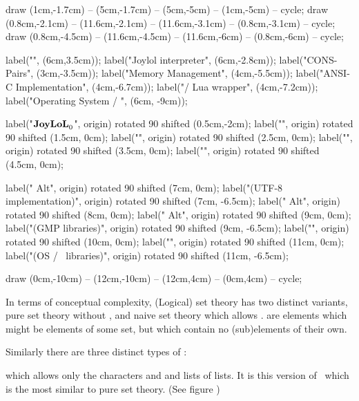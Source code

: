 draw (1cm,-1.7cm)   -- (5cm,-1.7cm)    -- (5cm,-5cm)      -- (1cm,-5cm)     -- cycle;
draw (0.8cm,-2.1cm) -- (11.6cm,-2.1cm) -- (11.6cm,-3.1cm) -- (0.8cm,-3.1cm) -- cycle;
draw (0.8cm,-4.5cm) -- (11.6cm,-4.5cm) -- (11.6cm,-6cm)   -- (0.8cm,-6cm)   -- cycle;


label("", (6cm,3.5cm));
label("Joylol interpreter", (6cm,-2.8cm));
label("CONS-Pairs", (3cm,-3.5cm));
label("Memory Management", (4cm,-5.5cm));
label("ANSI-C Implementation", (4cm,-6.7cm));
label("/ Lua wrapper", (4cm,-7.2cm));
label("Operating System / \LuaTeX", (6cm, -9cm));

label("$\bold{JoyLoL}_0$", origin) rotated 90 shifted (0.5cm,-2cm);
label("", origin) rotated 90 shifted (1.5cm, 0cm);
label("", origin) rotated 90 shifted (2.5cm, 0cm);
label("", origin) rotated 90 shifted (3.5cm, 0cm);
label("", origin) rotated 90 shifted (4.5cm, 0cm);

label(" Alt", origin) rotated 90 shifted (7cm, 0cm);
label("(UTF-8 implementation)", origin) rotated 90 shifted (7cm, -6.5cm);
label(" Alt", origin) rotated 90 shifted (8cm, 0cm);
label(" Alt", origin) rotated 90 shifted (9cm, 0cm);
label("(GMP libraries)", origin) rotated 90 shifted (9cm, -6.5cm);
label("", origin) rotated 90 shifted (10cm, 0cm);
label("", origin) rotated 90 shifted (11cm, 0cm);
label("(OS / \LuaTeX\ libraries)", origin) rotated 90 shifted (11cm, -6.5cm);

draw (0cm,-10cm) -- (12cm,-10cm) -- (12cm,4cm) -- (0cm,4cm) -- cycle;

\stopMPcode\egroup

In terms of conceptual complexity, (Logical) set theory has two distinct 
variants, pure set theory without , and naive set 
theory which allows .  are 
 elements which might be elements of some set, but which 
contain no (sub)elements of their own. 

Similarly there are three distinct types of \joylol: 

\startitemize[1]

\item {} which allows only the characters \quote{(} 
and \quote{)} and lists of lists. It is this version of \joylol\ which is 
the most similar to pure set theory. (See figure ) 

